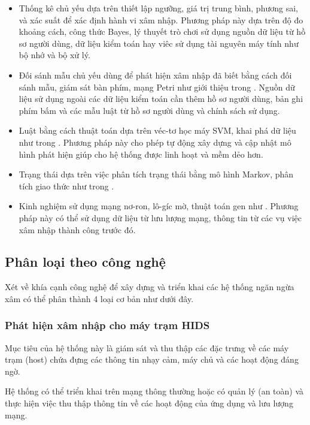 \begin{itemize}
    \item Thống kê chủ yếu dựa trên thiết lập ngưỡng, giá trị trung bình, phương sai, và
xác suất để xác định hành vi xâm nhập. Phương pháp này dựa trên độ đo
khoảng cách, công thức Bayes, lý thuyết trò chơi \cite{11} sử dụng nguồn dữ liệu từ
hồ sơ người dùng, dữ liệu kiểm toán hay viêc sử dụng tài nguyên máy tính như
bộ nhớ và bộ xử lý.
    \item Đối sánh mẫu chủ yếu dùng để phát hiện xâm nhập đã biết bằng cách đối sánh
mẫu, giám sát bàn phím, mạng Petri như giới thiệu trong \cite{12}. Nguồn dữ liệu sử
dụng ngoài các dữ liệu kiểm toán cần thêm hồ sơ người dùng, bản ghi phím
bấm và các mẫu luật từ hồ sơ người dùng và chính sách sử dụng.
    \item Luật bằng cách thuật toán dựa trên véc-tơ học máy SVM, khai phá dữ liệu như
trong \cite{2}. Phương pháp này cho phép tự động xây dựng và cập nhật mô hình
phát hiện giúp cho hệ thống được linh hoạt và mềm dẻo hơn.
    \item Trạng thái dựa trên việc phân tích trạng thái bằng mô hình Markov, phân tích
giao thức như trong \cite{9}.
    \item Kinh nghiệm sử dụng mạng nơ-ron, lô-gíc mờ, thuật toán gen như \cite{13,14}.
Phương pháp này có thể sử dụng dữ liệu từ lưu lượng mạng, thông tin từ các
vụ việc xâm nhập thành công trước đó.
\end{itemize}

\subsection{Phân loại theo công nghệ}

Xét về khía cạnh công nghệ để xây dựng và triển khai các hệ thống ngăn ngừa
xâm có thể phân thành 4 loại cơ bản như dưới đây.
\subsubsection*{Phát hiện xâm nhập cho máy trạm HIDS}

Mục tiêu của hệ thống này là giám sát và thu thập các đặc trưng về các máy
trạm (host) chứa đựng các thông tin nhạy cảm, máy chủ và các hoạt động đáng
ngờ.

Hệ thống có thể triển khai trên mạng thông thường hoặc có quản lý (an toàn) và thực hiện việc thu thập thông tin về các hoạt động của ứng dụng và lưu lượng mạng.

